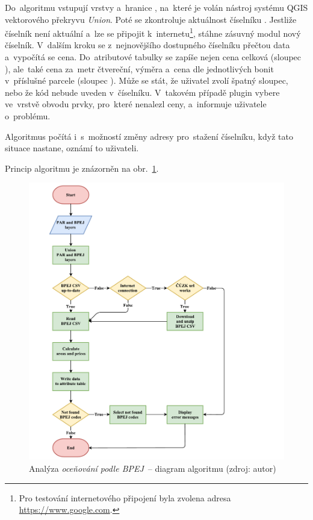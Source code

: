 Do~algoritmu vstupují vrstvy \texttt{} a~hranice ,
na~které je volán nástroj systému QGIS vektorového překryvu \textit{Union}. Poté se
zkontroluje aktuálnost číselníku . Jestliže číselník není
aktuální a~lze se připojit k~internetu\footnote{Pro testování
internetového připojení byla zvolena adresa
\url{https://www.google.com}.}, stáhne zásuvný modul nový
číselník. V~dalším kroku se z~nejnovějšího dostupného číselníku
přečtou data a~vypočítá se cena. Do~atributové tabulky se zapíše nejen
cena celková (sloupec \texttt{}), ale~také cena
za~metr čtvereční, výměra a~cena dle jednotlivých bonit v~příslušné
parcele (sloupec
\texttt{}). Může se stát, že
uživatel zvolí špatný sloupec, nebo že kód  nebude uveden
v~číselníku. V~takovém případě plugin vybere ve~vrstvě obvodu prvky,
pro~které nenalezl ceny, a~informuje uživatele o~problému.

Algoritmus počítá i~s~možností změny adresy pro~stažení číselníku,
když tato situace nastane, oznámí to uživateli.

Princip algoritmu je znázorněn na obr.~\ref{fig:diagram_bpej}.

	\begin{figure}[H] %
		\includegraphics[width=1.2\textwidth]{./pictures/bpej.pdf}
		\caption[Analýza \textit{oceňování podle BPEJ}~–
diagram algoritmu]{Analýza \textit{oceňování podle BPEJ}~– diagram
algoritmu (zdroj: autor)}
		\label{fig:diagram_bpej}
 	\end{figure}
